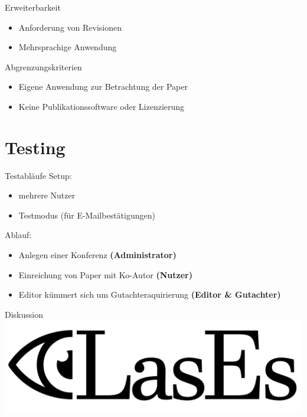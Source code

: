 \documentclass{beamer}
\begin{document}
    \begin{frame}{Erweiterbarkeit}
        \pause
        \begin{itemize}
            \item Anforderung von Revisionen
            \pause
            \item Mehrsprachige Anwendung
        \end{itemize}
    \end{frame}

    \begin{frame}{Abgrenzungskriterien}
        \pause
        \begin{itemize}
            \item Eigene Anwendung zur Betrachtung der Paper
            \pause
            \item Keine Publikationssoftware oder Lizenzierung
        \end{itemize}
    \end{frame}


    \section{Testing}
    \begin{frame}{Testabläufe}
        \pause
        Setup:
        \begin{itemize}
            \item mehrere Nutzer
            \item Testmodus (für E-Mailbestätigungen)
        \end{itemize}

        \pause

        Ablauf:
        \begin{itemize}
            \item Anlegen einer Konferenz \textbf{(Administrator)}
            \item Einreichung von Paper mit Ko-Autor \textbf{(Nutzer)}
            \item Editor kümmert sich um Gutachteraquirierung \textbf{(Editor \& Gutachter)}
        \end{itemize}
    \end{frame}

    \begin{frame}{Diskussion}
        \centering
        \includegraphics[width=0.7\linewidth]{../../docs/Pflichtenheft/graphics/LasEs-logo}
    \end{frame}
\end{document}
